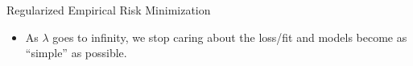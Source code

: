 \documentclass[11pt,compress,t,notes=noshow, xcolor=table]{beamer}
\begin{document}
\begin{vbframe}{Regularized Empirical Risk Minimization}
\begin{itemize}
  \item As $\lambda$ goes to infinity, we stop caring about the loss/fit and models become as \enquote{simple} as possible.
\end{itemize}





\end{vbframe}



\endlecture
\end{document}
